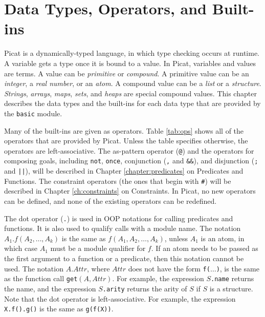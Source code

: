 \chapter{\label{chapter:datatypes}Data Types, Operators, and Built-ins}
Picat is a dynamically-typed language, in which type checking occurs at runtime. A variable gets a type once it is bound to a value. In Picat, variables and values are terms. A value can be \emph{primitive} or \emph{compound}. A primitive value can be an \emph{integer}, a \emph{real number}, or an \emph{atom}. A compound value can be a \emph{list} or a \emph{structure}. \emph{Strings}, \emph{arrays}, \emph{maps}, \emph{sets}, and \emph{heaps} are special compound values. This chapter describes the data types and the built-ins for each data type that are provided by the \texttt{basic} module. 

Many of the built-ins are given as operators. Table \ref{tab:ops} shows all of the operators that are provided by Picat. Unless the table specifies otherwise, the operators are left-associative.  The as-pattern operator (\verb+@+) and the operators for composing goals, including \texttt{not}, \texttt{once}, conjunction (\verb+,+ and \verb+&&+), and disjunction (\verb+;+ and \verb+||+), will be described in Chapter \ref{chapter:predicates} on Predicates and Functions.  The constraint operators (the ones that begin with \verb+#+) will be described in Chapter \ref{ch:constraints} on Constraints. In Picat, no new operators can be defined, and none of the existing operators can be redefined.

The dot operator (\verb+.+) is used in OOP notations for calling predicates and functions. It is also used to qualify calls with a module name. The notation \texttt{$A_1.f(A_2,\ldots,A_k)$} is the same as \texttt{$f(A_1,A_2,\ldots,A_k)$}, unless $A_1$ is an atom, in which case $A_1$ must be a module qualifier for $f$.  If an atom needs to be passed as the first argument to a function or a predicate, then this notation cannot be used. The notation $A.Attr$, where $Attr$ does not have the form \texttt{f($\ldots$)}, is the same as the function call \texttt{get$(A,Attr)$}. For example, the expression \texttt{$S$.name} returns the name, and the expression \texttt{$S$.arity} returns the arity of $S$ if $S$ is a structure.   Note that the dot operator is left-associative.  For example, the expression \texttt{X.f().g()} is the same as \texttt{g(f(X))}.

